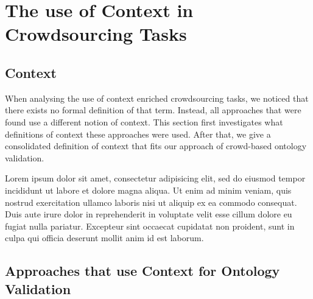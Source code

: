 \section{The use of Context in Crowdsourcing Tasks}
% 

\subsection{Context}
When analysing the use of context enriched crowdsourcing tasks, we noticed that there exists no formal definition of that term. Instead, all approaches that were found use a different notion of context. 
This section first investigates what definitions of context these approaches were used. After that, we give a consolidated definition of context that fits our approach of crowd-based ontology validation.


Lorem ipsum dolor sit amet, consectetur adipisicing elit, sed do eiusmod tempor incididunt ut labore et dolore magna aliqua. Ut enim ad minim veniam, quis nostrud exercitation ullamco laboris nisi ut aliquip ex ea commodo consequat. Duis aute irure dolor in reprehenderit in voluptate velit esse cillum dolore eu fugiat nulla pariatur. Excepteur sint occaecat cupidatat non proident, sunt in culpa qui officia deserunt mollit anim id est laborum.
\subsection{Approaches that use Context for Ontology Validation}
